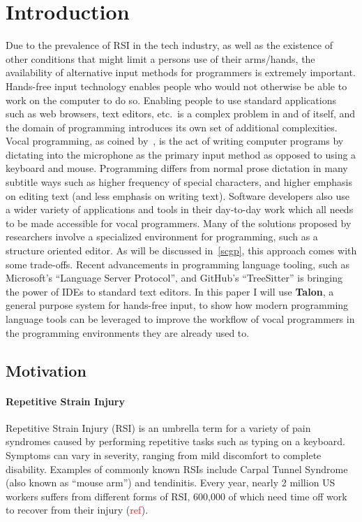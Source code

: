 \documentclass[../thesis.tex]{subfiles}
\begin{document}
\chapter{Introduction}
Due to the prevalence of RSI in the tech industry, as well as the existence of other conditions that might limit a persons use of their arms/hands, the availability
of alternative input methods for programmers is extremely important.
Hands-free input technology enables people who would not otherwise be able to work on the computer to do so.
Enabling people to use standard applications such as web browsers, text editors, etc.\ is a complex problem in and of itself, and the domain of programming
introduces its own set of additional complexities.
Vocal programming, as coined by~\parencite{Arnold}, is the act of writing computer programs by dictating into the microphone as the primary input method as opposed to using a keyboard and mouse.
Programming differs from normal prose dictation in many subtitle ways such as higher frequency of special characters, and higher emphasis on editing text (and less emphasis on writing text).
Software developers also use a wider variety of applications and tools in their day-to-day work which all needs to be made accessible for vocal programmers.
Many of the solutions proposed by researchers involve a specialized environment for programming, such as a structure oriented editor.
As will be discussed in~\ref{scgp}, this approach comes with some trade-offs.
Recent advancements in programming language tooling, such as Microsoft's ``Language Server Protocol'', and GitHub's ``TreeSitter'' is bringing the power of IDEs to standard text editors.
In this paper I will use \textbf{Talon}, a general purpose system for hands-free input, to show how modern programming language
   tools can be leveraged to improve the workflow of vocal programmers in the programming environments they are already used to.

\section{Motivation}

\subsubsection{Repetitive Strain Injury}
Repetitive Strain Injury (RSI) is an umbrella term for a variety of pain syndromes caused by
performing repetitive tasks such as typing on a keyboard.
Symptoms can vary in severity, ranging from mild discomfort to complete disability.
Examples of commonly known RSIs include Carpal Tunnel Syndrome (also known as ``mouse arm'') and tendinitis.
Every year, nearly 2 million US workers suffers from different forms of RSI, 600,000 of which
need time off work to recover from their injury (\textcolor{red}{ref}).
\end{document}
